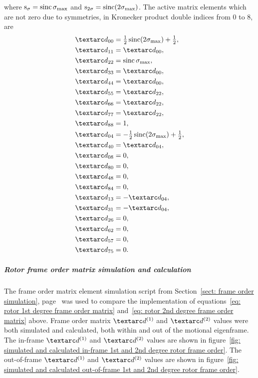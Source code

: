 where $\textrm{s}_\sigma = \operatorname{sinc}\sigma_\textrm{max}$ and $\textrm{s}_{2\sigma} = \operatorname{sinc}(2\sigma_\textrm{max})$.
The active matrix elements which are not zero due to symmetries, in Kronecker product double indices from 0 to 8, are
\begin{subequations} \label{eq: rotor 2nd degree frame order matrix}
\begin{align}
    &\FO_{00} = \half\sinc(2\conesmax) + \half , \\
    &\FO_{11} = \FO_{00} , \\
    &\FO_{22} = \sinc\conesmax , \\
    &\FO_{33} = \FO_{00} , \\
    &\FO_{44} = \FO_{00} , \\
    &\FO_{55} = \FO_{22} , \\
    &\FO_{66} = \FO_{22} , \\
    &\FO_{77} = \FO_{22} , \\
    &\FO_{88} = 1 , \\
    &\FO_{04} = -\half\sinc(2\conesmax) + \half , \\
    &\FO_{40} = \FO_{04} , \\
    &\FO_{08} = 0 , \\
    &\FO_{80} = 0 , \\
    &\FO_{48} = 0 , \\
    &\FO_{84} = 0 , \\
    &\FO_{13} = -\FO_{04} , \\
    &\FO_{31} = -\FO_{04} , \\
    &\FO_{26} = 0 , \\
    &\FO_{62} = 0 , \\
    &\FO_{57} = 0 , \\
    &\FO_{75} = 0 .
\end{align}
\end{subequations}


\subparagraph[Frame order matrix simulation and calculation]{Rotor frame order matrix simulation and calculation}

The frame order matrix element simulation script from Section~\ref{sect: frame order simulation}, page~\pageref{sect: frame order simulation} was used to compare the implementation of equations~\ref{eq: rotor 1st degree frame order matrix} and~\ref{eq: rotor 2nd degree frame order matrix} above.
Frame order matrix $\FOone$ and $\FOtwo$ values were both simulated and calculated, both within and out of the motional eigenframe.
The in-frame $\FOone$ and $\FOtwo$ values are shown in figure~\ref{fig: simulated and calculated in-frame 1st and 2nd degree rotor frame order}.
The out-of-frame $\FOone$ and $\FOtwo$ values are shown in figure~\ref{fig: simulated and calculated out-of-frame 1st and 2nd degree rotor frame order}.



